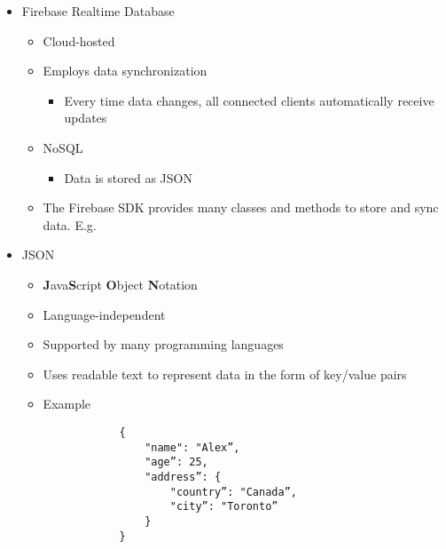 \begin{itemize}
	\item Firebase Realtime Database
	\begin{itemize}
		\item Cloud-hosted
		\item Employs data synchronization
		\begin{itemize}
			\item Every time data changes, all connected clients automatically receive updates
		\end{itemize}
		\item NoSQL
		\begin{itemize}
			\item Data is stored as JSON
		\end{itemize}
		\item The Firebase SDK provides many classes and methods to store and sync data. E.g.
	\end{itemize}

	\item JSON
	\begin{itemize}
		\item \textbf{J}ava\textbf{S}cript \textbf{O}bject \textbf{N}otation
		\item Language-independent
		\item Supported by many programming languages
		\item Uses readable text to represent data in the form of key/value pairs
		\item Example \begin{Verbatim}
			{
				"name": "Alex”,
				"age”: 25,
				"address”: {
					"country”: "Canada”,
					"city”: "Toronto”
				}
			}
		\end{Verbatim}

	\end{itemize}
\end{itemize}

%
